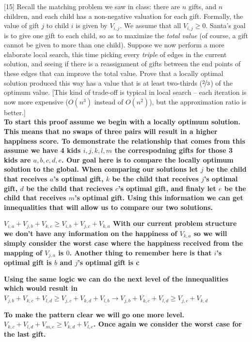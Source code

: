 \documentclass[addpoints]{exam}
\begin{document}
\begin{questions}
[15]
Recall the matching problem we saw in class: there are $n$ gifts, and $n$ children,
and each child has a non-negative valuation for each gift. Formally, the value of
gift $j$ to child $i$ is given by $V_{i,j}$. We assume that all $V_{i,j} \ge 0$.
Santa's goal is to give one gift to each child, so as to maximize the {\em total
value} (of course, a gift cannot be given to more than one child).
Suppose we now perform a more elaborate local search, this time picking every {\em
triple} of edges in the current solution, and seeing if there is a reassignment of
gifts between the end points of these edges that can improve the total value. Prove
that a locally optimal solution produced this way has a value that is at least two-thirds ($\nicefrac{2}{3}$) of the optimum value. [This kind of trade-off is typical in local search --
each iteration is now more expensive ($O(n^3)$ instead of $O(n^2)$), but the
approximation ratio is better.]\\

\textbf{To start this proof assume we begin with a locally optimum solution. This means that no swaps of three pairs will result in a higher happiness score. To demonstrate the relationship that comes from this assume we have 4 kids $i,j,k,l,m$ the correspodning gifts for those 3 kids are $a,b,c,d,e$. Our goal here is to compare the locally optimum solution to the global. When comparing our solutions let $j$ be the child that receives $a$'s optimal gift, $k$ be the child that receives $j$'s optimal gift, $d$ be the child that recieves $c$'s optimal gift, and finaly let $e$ be the child that receives $m$'s optimal gift. Using this information we can get innequalities that will allow us to compare our two solutions.}

\textbf{$V_{i,a} + V_{j,b} + V_{k,c} \ge V_{i,b} + V_{j,c} + V_{k,a}$ With our current problem structure we don't have any information on the happiness of $V_{k,a}$ so we will simply consider the worst case where the happiness received from the mapping of $V_{j,a}$ is $0$. Another thing to remember here is that $i$'s optimal gift is $b$ and $j$'s optimal gift is c}

\textbf{Using the same logic we can do the next level of the innequalities which would result in $V_{j,b} + V_{k,c} + V_{l,d} \ge V_{j,c} + V_{k,d} + V_{l,b} \rightarrow V_{j,b} + V_{k,c} + V_{l,d} \ge V_{j,c} + V_{k,d}$}

\textbf{To make the pattern clear we will go one more level. $V_{k,c} + V_{l,d} + V_{m,e} \ge V_{k,d} + V_{l,e}$. Once again we consider the worst case for the last gift.}


\end{questions}
\end{document}
